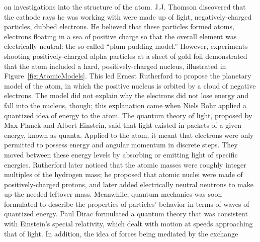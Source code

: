 on investigations into the structure of the atom.  
J.J. Thomson discovered that the cathode rays 
he was working with were 
made up of light, negatively-charged particles, 
dubbed electrons.  
He believed that these particles formed atoms, 
electrons floating in a sea of positive charge 
so that the overall element was electrically neutral: %
the so-called ``plum pudding model.''  
However, experiments shooting positively-charged 
alpha particles at a sheet of gold foil demonstrated 
that the atom included a hard, positively-charged nucleus, 
illustrated in Figure~\ref{fig:AtomicModels}.  
This led Ernest Rutherford to propose the 
planetary model of the atom, in which the positive nucleus 
is orbited by a cloud of negative electrons.  
The model did not explain why the electrons did not 
lose energy and fall into the nucleus, though; 
this explanation came when Niels Bohr applied a 
quantized idea of energy to the atom.  
The quantum theory of light, 
proposed by Max Planck and Albert Einstein, 
said that light existed in packets of a given energy, 
known as quanta. 
Applied to the atom, it meant that 
electrons were only permitted to possess 
energy and angular momentum in discrete steps.  
They moved between these energy levels by absorbing 
or emitting light of specific energies.  
Rutherford later noticed that the atomic masses 
were roughly integer multiples of the hydrogen mass; 
he proposed that atomic nuclei were made of 
positively-charged protons, 
and later added electrically neutral neutrons 
to make up the needed leftover mass.  
Meanwhile, quantum mechanics was soon formulated to describe 
the properties of particles' behavior in terms of waves 
of quantized energy.  
Paul Dirac formulated a quantum theory that was consistent 
with Einstein's special relativity, 
which dealt with motion at speeds approaching that of light.  
In addition, the idea of forces being mediated by the exchange 
